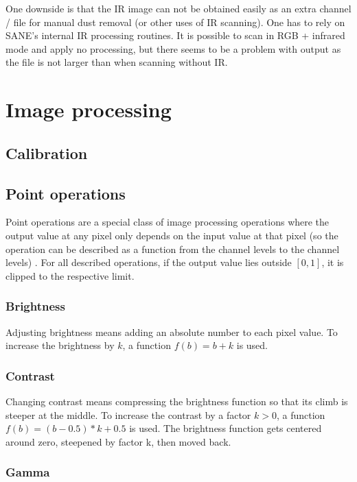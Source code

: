 \documentclass{article}
\begin{document}
One downside is that the IR image can not be obtained easily as an extra channel
/ file for manual dust removal (or other uses of IR scanning). One has to rely
on SANE's internal IR processing routines. It is possible to scan in RGB + infrared
mode and apply no processing, but there seems to be a problem with output as the
file is not larger than when scanning without IR.

\section{Image processing}
\label{sec:imgproc}

\subsection{Calibration}

\subsection{Point operations}

Point operations are a special class of image processing operations where the output value
at any pixel only depends on the input value at that pixel (so the operation
can be described as a function from the channel levels to the channel levels) \cite{pointwise_gimp}.
For all described operations, if the output value lies outside $[0, 1]$,
it is clipped to the respective limit.

\subsubsection{Brightness}

Adjusting brightness means adding an absolute number to each pixel value.
To increase the brightness by $k$, a function $f(b) = b + k$ is used.

\subsubsection{Contrast}

Changing contrast means compressing the brightness function so that its climb
is steeper at the middle.
To increase the contrast by a factor $k > 0$, a function $f(b) = (b - 0.5) * k + 0.5$ is used.
The brightness function gets centered around zero, steepened by factor k, then moved
back.

\subsubsection{Gamma}
\end{document}
